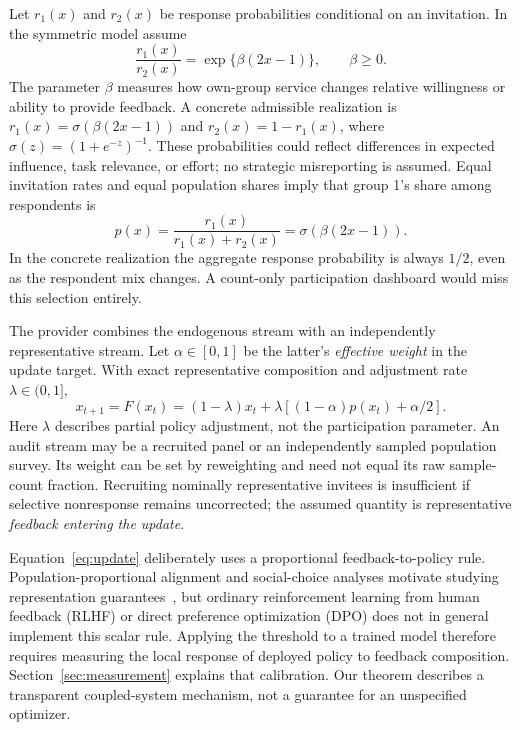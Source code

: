 \documentclass{article}
\begin{document}
Let $r_1(x)$ and $r_2(x)$ be response probabilities conditional on an invitation. In the symmetric model assume
\begin{equation}
\frac{r_1(x)}{r_2(x)}=\exp\{\beta(2x-1)\},\qquad \beta\ge0.
\label{eq:ratio}
\end{equation}
The parameter $\beta$ measures how own-group service changes relative willingness or ability to provide feedback. A concrete admissible realization is $r_1(x)=\sigma(\beta(2x-1))$ and $r_2(x)=1-r_1(x)$, where $\sigma(z)=(1+e^{-z})^{-1}$. These probabilities could reflect differences in expected influence, task relevance, or effort; no strategic misreporting is assumed. Equal invitation rates and equal population shares imply that group 1's share among respondents is
\begin{equation}
p(x)=\frac{r_1(x)}{r_1(x)+r_2(x)}=\sigma(\beta(2x-1)).
\label{eq:participation}
\end{equation}
In the concrete realization the aggregate response probability is always $1/2$, even as the respondent mix changes. A count-only participation dashboard would miss this selection entirely.

The provider combines the endogenous stream with an independently representative stream. Let $\alpha\in[0,1]$ be the latter's \emph{effective weight} in the update target. With exact representative composition and adjustment rate $\lambda\in(0,1]$,
\begin{equation}
x_{t+1}=F(x_t)=(1-\lambda)x_t+\lambda\left[(1-\alpha)p(x_t)+\alpha/2\right].
\label{eq:update}
\end{equation}
Here $\lambda$ describes partial policy adjustment, not the participation parameter. An audit stream may be a recruited panel or an independently sampled population survey. Its weight can be set by reweighting and need not equal its raw sample-count fraction. Recruiting nominally representative invitees is insufficient if selective nonresponse remains uncorrected; the assumed quantity is representative \emph{feedback entering the update}.

Equation~\eqref{eq:update} deliberately uses a proportional feedback-to-policy rule. Population-proportional alignment and social-choice analyses motivate studying representation guarantees~\citep{kim2026,ge2024,fish2025}, but ordinary reinforcement learning from human feedback (RLHF) or direct preference optimization (DPO) does not in general implement this scalar rule. Applying the threshold to a trained model therefore requires measuring the local response of deployed policy to feedback composition. Section~\ref{sec:measurement} explains that calibration. Our theorem describes a transparent coupled-system mechanism, not a guarantee for an unspecified optimizer.
\end{document}
